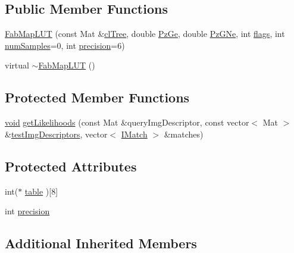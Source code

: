 \subsection*{Public Member Functions}
\begin{DoxyCompactItemize}
\item 
\hyperlink{classcv_1_1of2_1_1FabMapLUT_a7942a2898e2696b5e2379b4f339822d0}{Fab\-Map\-L\-U\-T} (const Mat \&\hyperlink{classcv_1_1of2_1_1FabMap_a54e4331990e8069be69fec53b545c2bd}{cl\-Tree}, double \hyperlink{classcv_1_1of2_1_1FabMap_a0c79d4180f0ffe49bfbfe541b9981e7b}{Pz\-Ge}, double \hyperlink{classcv_1_1of2_1_1FabMap_a0bf851f305f6a00d5a837a7c70e40f3d}{Pz\-G\-Ne}, int \hyperlink{highgui__c_8h_ae51e3a2d4365e85db9630dd3ce9508db}{flags}, int \hyperlink{classcv_1_1of2_1_1FabMap_a023e2c53333bb5505baceb182011980f}{num\-Samples}=0, int \hyperlink{classcv_1_1of2_1_1FabMapLUT_a17fdbb7081ffb5aa3e41545d4e2d893d}{precision}=6)
\item 
virtual \hyperlink{classcv_1_1of2_1_1FabMapLUT_a3ca7cd64f582bdbfc84b7ad5fd0d7404}{$\sim$\-Fab\-Map\-L\-U\-T} ()
\end{DoxyCompactItemize}
\subsection*{Protected Member Functions}
\begin{DoxyCompactItemize}
\item 
\hyperlink{legacy_8hpp_a8bb47f092d473522721002c86c13b94e}{void} \hyperlink{classcv_1_1of2_1_1FabMapLUT_a8609f5fc85512ba604147384c6ce301d}{get\-Likelihoods} (const Mat \&query\-Img\-Descriptor, const vector$<$ Mat $>$ \&\hyperlink{classcv_1_1of2_1_1FabMap_a46f350e86965ec1e00ae4bd629dd4c8d}{test\-Img\-Descriptors}, vector$<$ \hyperlink{structcv_1_1of2_1_1IMatch}{I\-Match} $>$ \&matches)
\end{DoxyCompactItemize}
\subsection*{Protected Attributes}
\begin{DoxyCompactItemize}
\item 
int($\ast$ \hyperlink{classcv_1_1of2_1_1FabMapLUT_a352e628a91877a506e90dd4440b95212}{table} )\mbox{[}8\mbox{]}
\item 
int \hyperlink{classcv_1_1of2_1_1FabMapLUT_a17fdbb7081ffb5aa3e41545d4e2d893d}{precision}
\end{DoxyCompactItemize}
\subsection*{Additional Inherited Members}


